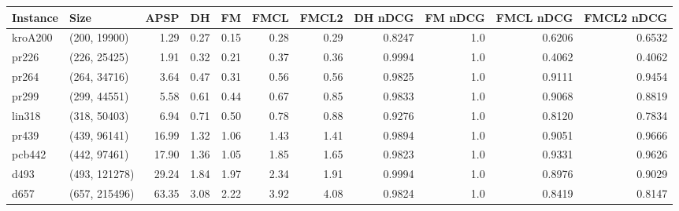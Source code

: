 \begin{tabular}{llrrrrrrrrr}
\toprule
Instance &          Size &  APSP &   DH &   FM &  FMCL &  FMCL2 &  DH nDCG &  FM nDCG &  FMCL nDCG &  FMCL2 nDCG \\
\midrule
 kroA200 &  (200, 19900) &  1.29 & 0.27 & 0.15 &  0.28 &   0.29 &   0.8247 &      1.0 &     0.6206 &      0.6532 \\
   pr226 &  (226, 25425) &  1.91 & 0.32 & 0.21 &  0.37 &   0.36 &   0.9994 &      1.0 &     0.4062 &      0.4062 \\
   pr264 &  (264, 34716) &  3.64 & 0.47 & 0.31 &  0.56 &   0.56 &   0.9825 &      1.0 &     0.9111 &      0.9454 \\
   pr299 &  (299, 44551) &  5.58 & 0.61 & 0.44 &  0.67 &   0.85 &   0.9833 &      1.0 &     0.9068 &      0.8819 \\
  lin318 &  (318, 50403) &  6.94 & 0.71 & 0.50 &  0.78 &   0.88 &   0.9276 &      1.0 &     0.8120 &      0.7834 \\
   pr439 &  (439, 96141) & 16.99 & 1.32 & 1.06 &  1.43 &   1.41 &   0.9894 &      1.0 &     0.9051 &      0.9666 \\
  pcb442 &  (442, 97461) & 17.90 & 1.36 & 1.05 &  1.85 &   1.65 &   0.9823 &      1.0 &     0.9331 &      0.9626 \\
    d493 & (493, 121278) & 29.24 & 1.84 & 1.97 &  2.34 &   1.91 &   0.9994 &      1.0 &     0.8976 &      0.9029 \\
    d657 & (657, 215496) & 63.35 & 3.08 & 2.22 &  3.92 &   4.08 &   0.9824 &      1.0 &     0.8419 &      0.8147 \\
\bottomrule
\end{tabular}
